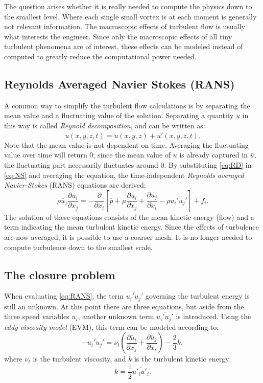 The question arises whether it is really needed to compute the physics down to the smallest level. Where each single small vortex is at each moment is generally not relevant information. The macroscopic effects of turbulent flow is usually what interests the engineer. Since only the macroscopic effects of all tiny turbulent phenomena are of interest, these effects can be modeled instead of computed to greatly reduce the computational power needed. 

\subsection{Reynolds Averaged Navier Stokes (RANS)}
A common way to simplify the turbulent flow calculations is by separating the mean value and a fluctuating value of the solution. Separating a quantity $u$ in this way is called \emph{Reynold decomposition}, and can be written as:
\begin{equation}\label{eq:RD}
u(x,y,z,t) = \overline{u(x,y,z)}+u'(x,y,z,t).
\end{equation}
Note that the mean value is not dependent on time. Averaging the fluctuating value over time will return 0; since the mean value of $u$ is already captured in $\bar{u}$, the fluctuating part necessarily fluctuates around 0. By substituting \autoref{eq:RD} in \autoref{eq:NS} and averaging the equation, the time-independent \emph{Reynolds averaged Navier-Stokes} (RANS) equations are derived:
\begin{equation}\label{eq:RANS}
\rho \bar{u}_j \frac{\partial \bar{u}_i}{\partial x_j} = -\frac{\partial}{\partial x_i} \left[ \bar{p} + \mu \frac{\partial \bar{u}_i}{\partial x_j} + \frac{\partial \bar{u}_j}{\partial x_i} - \rho \overline{u_i'u_j'}\right] + f_i. 
\end{equation} 
The solution of these equations consists of the mean kinetic energy (flow) and a term indicating the mean turbulent kinetic energy. Since the effects of turbulence are now averaged, it is possible to use a coarser mesh. It is no longer needed to compute turbulence down to the smallest scale. 

\subsection{The closure problem}
When evaluating \autoref{eq:RANS}, the term $\overline{u_i'u_j'}$ governing the turbulent energy is still an unknown. At this point there are three equations, but aside from the three speed variables $u_i$, another unknown term $\overline{u_i'u_j'}$ is introduced. Using the \emph{eddy viscosity model} (EVM), this term can be modeled according to:
\begin{equation}\label{eq:EVM}
-\overline{u_i'u_j'}=\nu_t\left(\frac{\partial \bar{u}_i}{\partial x_j} + \frac{\partial \bar{u}_j}{\partial x_i} \right) - \frac{2}{3}k,
\end{equation}
where $\nu_t$ is the turbulent viscosity, and $k$ is the turbulent kinetic energy:
\begin{equation}\label{eq:k}
k = \frac{1}{2}\overline{u'_iu'_i}.
\end{equation}

